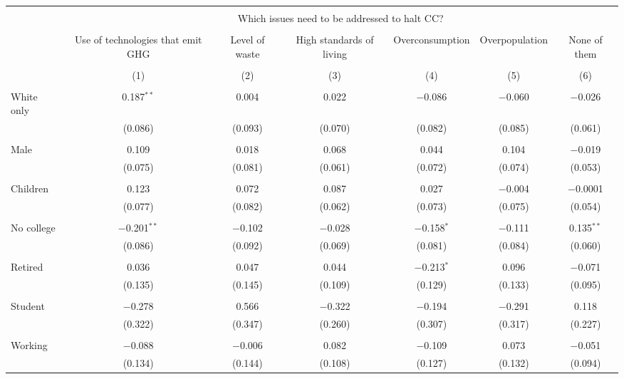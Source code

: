 
\begin{tabular}{@{\extracolsep{5pt}}lcccccc} 
\\[-1.8ex]\hline 
\hline \\[-1.8ex] 
 & \multicolumn{6}{c}{Which issues need to be addressed to halt CC?} \\ 
\cline{2-7} 
\\[-1.8ex] & Use of technologies that emit GHG & Level of waste & High standards of living & Overconsumption & Overpopulation & None of them \\ 
\\[-1.8ex] & (1) & (2) & (3) & (4) & (5) & (6)\\ 
\hline \\[-1.8ex] 
 White only & 0.187$^{**}$ & 0.004 & 0.022 & $-$0.086 & $-$0.060 & $-$0.026 \\ 
  & (0.086) & (0.093) & (0.070) & (0.082) & (0.085) & (0.061) \\ 
  & & & & & & \\ 
 Male & 0.109 & 0.018 & 0.068 & 0.044 & 0.104 & $-$0.019 \\ 
  & (0.075) & (0.081) & (0.061) & (0.072) & (0.074) & (0.053) \\ 
  & & & & & & \\ 
 Children & 0.123 & 0.072 & 0.087 & 0.027 & $-$0.004 & $-$0.0001 \\ 
  & (0.077) & (0.082) & (0.062) & (0.073) & (0.075) & (0.054) \\ 
  & & & & & & \\ 
 No college & $-$0.201$^{**}$ & $-$0.102 & $-$0.028 & $-$0.158$^{*}$ & $-$0.111 & 0.135$^{**}$ \\ 
  & (0.086) & (0.092) & (0.069) & (0.081) & (0.084) & (0.060) \\ 
  & & & & & & \\ 
 Retired & 0.036 & 0.047 & 0.044 & $-$0.213$^{*}$ & 0.096 & $-$0.071 \\ 
  & (0.135) & (0.145) & (0.109) & (0.129) & (0.133) & (0.095) \\ 
  & & & & & & \\ 
 Student & $-$0.278 & 0.566 & $-$0.322 & $-$0.194 & $-$0.291 & 0.118 \\ 
  & (0.322) & (0.347) & (0.260) & (0.307) & (0.317) & (0.227) \\ 
  & & & & & & \\ 
 Working & $-$0.088 & $-$0.006 & 0.082 & $-$0.109 & 0.073 & $-$0.051 \\ 
  & (0.134) & (0.144) & (0.108) & (0.127) & (0.132) & (0.094) \\ 

\end{tabular}
